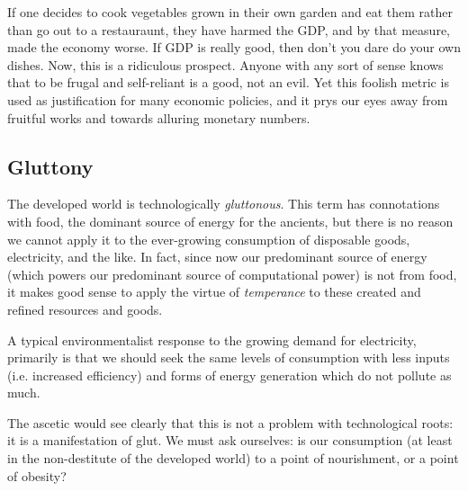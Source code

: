 \documentclass[letterpaper]{article}
\begin{document}
If one decides to cook vegetables grown in their own garden and eat them rather than go out to a restauraunt, they have harmed the GDP, and by that measure, made the economy worse. If GDP is really good, then don't you dare do your own dishes. Now, this is a ridiculous prospect. Anyone with any sort of sense knows that to be frugal and self-reliant is a good, not an evil. Yet this foolish metric is used as justification for many economic policies, and it prys our eyes away from fruitful works and towards alluring monetary numbers.


\iffalse
\subsection{Gnosticism}

Seeing these disconnecting patterns, the other heresy has become apparent in our times as well: the \textit{gnostic} heresy: that material things are flawed, evil, or are in some sense inauthentic or a distraction. These heretics have been throroughly rebuked by such saints as Irenaeus.
\fi

\subsection{Gluttony}

The developed world is technologically \textit{gluttonous}. This term has connotations with food, the dominant source of energy for the ancients, but there is no reason we cannot apply it to the ever-growing consumption of disposable goods, electricity, and the like. In fact, since now our predominant source of energy (which powers our predominant source of computational power) is not from food, it makes good sense to apply the virtue of \textit{temperance} to these created and refined resources and goods.

A typical environmentalist response to the growing demand for electricity, primarily is that we should seek the same levels of consumption with less inputs (i.e. increased efficiency) and forms of energy generation which do not pollute as much.

The ascetic would see clearly that this is not a problem with technological roots: it is a manifestation of glut. We must ask ourselves: is our consumption (at least in the non-destitute of the developed world) to a point of nourishment, or a point of obesity?
\end{document}

